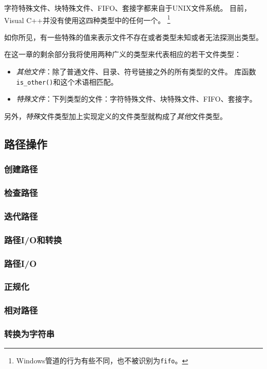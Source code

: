 字符特殊文件、块特殊文件、FIFO、套接字都来自于UNIX文件系统。
目前，Visual C++并没有使用这四种类型中的任何一个。
\footnote{Windows管道的行为有些不同，也不被识别为\texttt{fifo}。}

如你所见，有一些特殊的值来表示文件不存在或者类型未知或者无法探测出类型。

在这一章的剩余部分我将使用两种广义的类型来代表相应的若干文件类型：
\begin{itemize}[leftmargin=*]
    \item \emph{其他文件}：除了普通文件、目录、符号链接之外的所有类型的文件。
    库函数\texttt{is\_other()}和这个术语相匹配。
    \item \emph{特殊文件}：下列类型的文件：字符特殊文件、块特殊文件、FIFO、套接字。
\end{itemize}
另外，\emph{特殊}文件类型加上实现定义的文件类型就构成了\emph{其他}文件类型。

\subsection{路径操作}

\subsubsection{创建路径}

\subsubsection{检查路径}

\subsubsection*{迭代路径}

\subsubsection{路径I/O和转换}\label{ch20.3.3}
\subsubsection*{路径I/O}
\subsubsection*{正规化}
\subsubsection*{相对路径}
\subsubsection*{转换为字符串}

